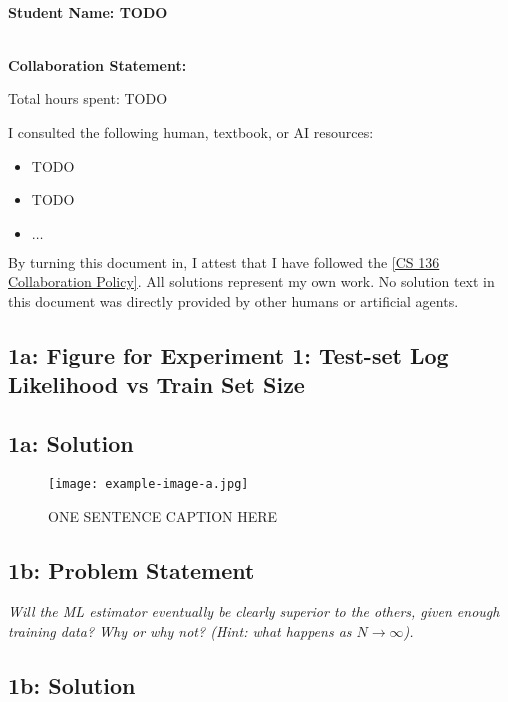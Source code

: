 \documentclass[12pt]{article}
\newcommand{\officialdirections}[1]{{\color{purple} #1}}
\begin{document}
~\\ %
{\Large{\bf Student Name: TODO}}

~\\ %
{\bf Collaboration Statement:}

Total hours spent: TODO

I consulted the following human, textbook, or AI resources:
\begin{itemize}
\item TODO
\item TODO
\item $\ldots$	
\end{itemize}

By turning this document in, I attest that I have followed the 
\href{https://www.cs.tufts.edu/cs/136/2025f/index.html#collaboration}{[CS 136 Collaboration Policy]}. All solutions represent my own work. No solution text in this document was directly provided by other humans or artificial agents. 
\setcounter{tocdepth}{2}
\tableofcontents

\newpage

\officialdirections{
\subsection*{1a: Figure for Experiment 1: Test-set Log Likelihood vs Train Set Size }
}

\subsection{1a: Solution}

\begin{figure}[!h]
     \centering
     \texttt{[image: example-image-a.jpg]} %
     \caption{ONE SENTENCE CAPTION HERE}
     \label{fig:fig1a}
\end{figure}


\newpage 
\officialdirections{
\subsection*{1b: Problem Statement}

\emph{\large
 Will the ML estimator eventually be clearly superior to the others, given enough training data? Why or why not? (Hint: what happens as $N \rightarrow \infty$).
}}

\subsection{1b: Solution}
\end{document}
